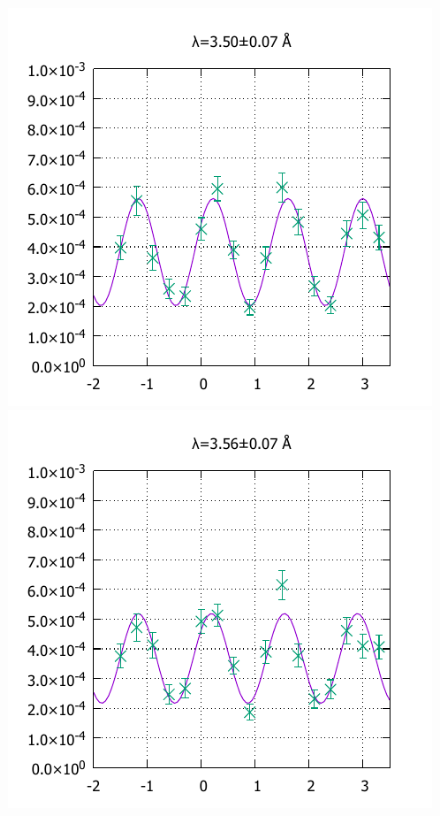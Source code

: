 \begin{figure}[H]
\begin{minipage}{0.33\hsize}
\includegraphics[width=\imgwidth]{phase_shifter/wl/wlf4.pdf}
\end{minipage}
\begin{minipage}{0.33\hsize}
\includegraphics[width=\imgwidth]{phase_shifter/wl/wlf5.pdf}
\end{minipage}
\begin{minipage}{0.33\hsize}

\end{minipage}
\end{figure}
